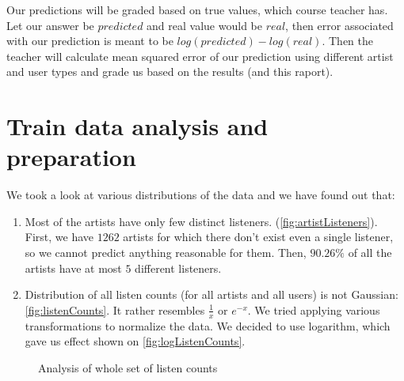 \documentclass{report}
\begin{document}
Our predictions will be graded based on true values, which course teacher has. Let our answer be $predicted$ and real value would be $real$, then error associated with our prediction is meant to be $log(predicted) - log(real)$. Then the teacher will calculate mean squared error \cite{mse} of our prediction using different artist and user types and grade us based on the results (and this raport).

\section{Train data analysis and preparation}
We took a look at various distributions of the data and we have found out that:
\begin{enumerate}[1.]
\item Most of the artists have only few distinct listeners. (\ref{fig:artistListeners}). First, we have $1262$ artists for which there don't exist even a single listener, so we cannot predict anything reasonable for them. Then, $90.26\%$ of all the artists have at most $5$ different listeners.
\item Distribution of all listen counts (for all artists and all users) is not Gaussian: \ref{fig:listenCounts}. It rather resembles $\frac{1}{x}$ or $e^{-x}$. We tried applying various transformations to normalize the data. We decided to use logarithm, which gave us effect shown on \ref{fig:logListenCounts}.
\end{enumerate}
\begin{figure}[!h]
\center
{}
\hfill
{}

\caption{Analysis of whole set of listen counts}
\end{figure}
\end{document}
